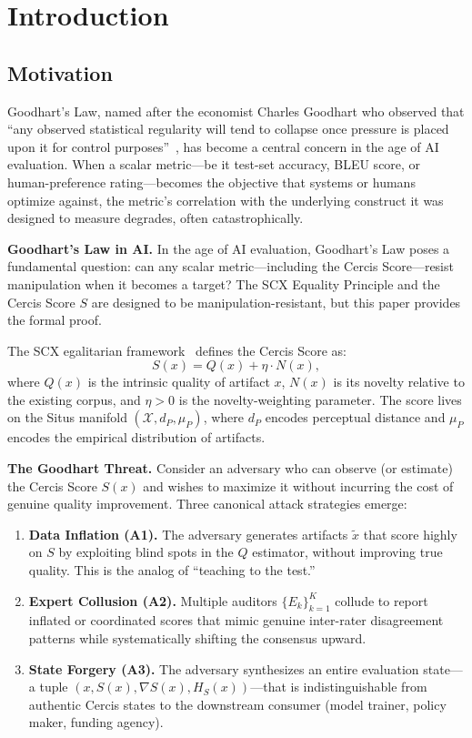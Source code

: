 \documentclass[11pt,a4paper]{article}
\theoremstyle{plain}
\theoremstyle{definition}
\theoremstyle{remark}
\begin{document}
\section{Introduction}
\label{sec:intro}
\subsection{Motivation}
Goodhart's Law, named after the economist Charles Goodhart who observed that
``any observed statistical regularity will tend to collapse once pressure is
placed upon it for control purposes''~\cite{goodhart1975problems}, has become a
central concern in the age of AI evaluation. When a scalar metric---be it
test-set accuracy, BLEU score, or human-preference rating---becomes the
objective that systems or humans optimize against, the metric's correlation
with the underlying construct it was designed to measure degrades, often
catastrophically.

\smallskip
\noindent
\textbf{Goodhart's Law in AI.} In the age of AI evaluation, Goodhart's Law poses a fundamental question: can any scalar metric---including the Cercis Score---resist manipulation when it becomes a target? The SCX Equality Principle and the Cercis Score \(S\) are designed to be manipulation-resistant, but this paper provides the formal proof.

The SCX egalitarian framework~\cite{scx2025} defines the Cercis Score as:
\begin{equation}\label{eq:cercis_def}
  S(x) = Q(x) + \eta \cdot N(x),
\end{equation}
where \(Q(x)\) is the intrinsic quality of artifact \(x\), \(N(x)\) is its novelty
relative to the existing corpus, and \(\eta > 0\) is the novelty-weighting
parameter. The score lives on the Situs manifold \((\mathcal{X}, d_P, \mu_P)\),
where \(d_P\) encodes perceptual distance and \(\mu_P\) encodes the empirical
distribution of artifacts.

\medskip
\noindent
\textbf{The Goodhart Threat.} Consider an adversary who can observe (or
estimate) the Cercis Score \(S(x)\) and wishes to maximize it without incurring
the cost of genuine quality improvement. Three canonical attack strategies
emerge:
\begin{enumerate}[label=\textbf{A\arabic*}, leftmargin=*]
  \item \textbf{Data Inflation (A1).} The adversary generates artifacts \(\tilde{x}\)
        that score highly on \(S\) by exploiting blind spots in the \(Q\) estimator,
        without improving true quality. This is the analog of ``teaching to the test.''
  \item \textbf{Expert Collusion (A2).} Multiple auditors \(\{E_k\}_{k=1}^K\) collude
        to report inflated or coordinated scores that mimic genuine inter-rater
        disagreement patterns while systematically shifting the consensus upward.
  \item \textbf{State Forgery (A3).} The adversary synthesizes an entire evaluation
        state---a tuple \((x, S(x), \nabla S(x), H_S(x))\)---that is indistinguishable
        from authentic Cercis states to the downstream consumer (model trainer,
        policy maker, funding agency).
\end{enumerate}
\end{document}
